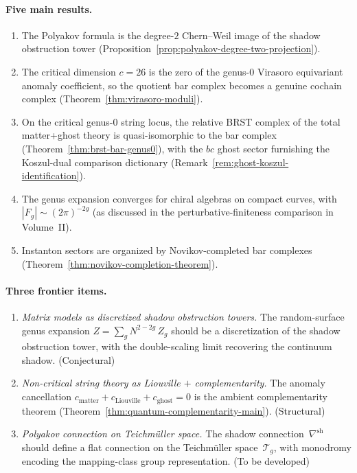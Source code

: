 \paragraph{Five main results.}

\begin{enumerate}[label=\textup{(\roman*)}]
\item The Polyakov formula is the degree-$2$ Chern--Weil image
 of the shadow obstruction tower
 (Proposition~\ref{prop:polyakov-degree-two-projection}).
\item The critical dimension $c = 26$ is the zero of the genus-$0$
 Virasoro equivariant anomaly coefficient, so the quotient bar
 complex becomes a genuine cochain complex
 (Theorem~\ref{thm:virasoro-moduli}).
\item On the critical genus-$0$ string locus, the relative BRST
 complex of the total matter+ghost theory is quasi-isomorphic to
 the bar complex
 (Theorem~\ref{thm:brst-bar-genus0}), with the $bc$ ghost sector
 furnishing the Koszul-dual comparison dictionary
 (Remark~\ref{rem:ghost-koszul-identification}).
\item The genus expansion converges for chiral algebras on
 compact curves, with $|F_g| \sim (2\pi)^{-2g}$
 (as discussed in the perturbative-finiteness comparison in
 Volume~II).
\item Instanton sectors are organized by Novikov-completed
 bar complexes
 (Theorem~\ref{thm:novikov-completion-theorem}).
\end{enumerate}

\paragraph{Three frontier items.}

\begin{enumerate}[label=\textup{(\alph*)}]
\item \emph{Matrix models as discretized shadow obstruction towers.}
 The random-surface genus expansion
 $Z = \sum_g N^{2-2g}\,Z_g$ should be a discretization of
 the shadow obstruction tower, with the double-scaling limit recovering
 the continuum shadow.
 \hfill\textup{(Conjectural)}
\item \emph{Non-critical string theory as Liouville $+$
 complementarity.}
 The anomaly cancellation
 $c_{\mathrm{matter}} + c_{\mathrm{Liouville}} +
 c_{\mathrm{ghost}} = 0$
 is the ambient complementarity theorem
 (Theorem~\ref{thm:quantum-complementarity-main}).
 \hfill\textup{(Structural)}
\item \emph{Polyakov connection on Teichm\"uller space.}
 The shadow connection~$\nabla^{\mathrm{sh}}$ should define a
 flat connection on the Teichm\"uller space~$\mathcal{T}_g$,
 with monodromy encoding the mapping-class group
 representation.
 \hfill\textup{(To be developed)}
\end{enumerate}

